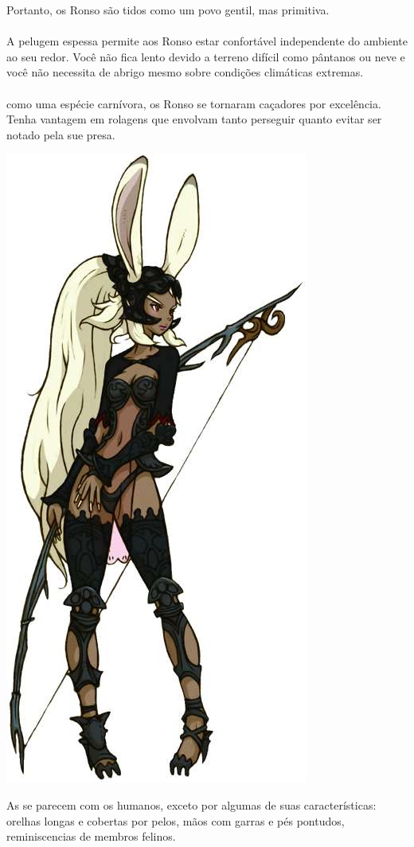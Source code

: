 Portanto, os Ronso são tidos como um povo gentil, mas primitiva.
%
\\\\
%
 A pelugem espessa permite aos Ronso estar confortável independente do ambiente ao seu redor.
Você não fica lento devido a terreno difícil como pântanos ou neve e você não necessita de abrigo mesmo sobre condições climáticas extremas.
%
\\\\
%
 como uma espécie carnívora, os Ronso se tornaram caçadores por excelência. Tenha vantagem em rolagens que envolvam tanto perseguir quanto evitar ser notado pela sue presa.
%
\newpage
%
%
\begin{center} \includegraphics[width=0.58\columnwidth]{./art/races/viera.jpg} \end{center}
%
As  se parecem com os humanos, exceto por algumas de suas características: orelhas longas e cobertas por pelos, mãos com garras e pés pontudos, reminiscencias de membros felinos.
